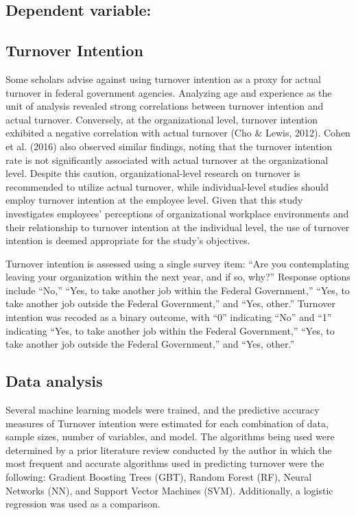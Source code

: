 \documentclass[
  man]{apa7}
\begin{document}
\hypertarget{dependent-variable}{%
\subsection{Dependent variable:}\label{dependent-variable}}

\hypertarget{turnover-intention}{%
\subsection{Turnover Intention}\label{turnover-intention}}

Some scholars advise against using turnover intention as a proxy for actual turnover in federal government agencies.
Analyzing age and experience as the unit of analysis revealed strong correlations between turnover intention and actual turnover.
Conversely, at the organizational level, turnover intention exhibited a negative correlation with actual turnover (Cho \& Lewis, 2012).
Cohen et al. (2016) also observed similar findings, noting that the turnover intention rate is not significantly associated with actual turnover at the organizational level.
Despite this caution, organizational-level research on turnover is recommended to utilize actual turnover, while individual-level studies should employ turnover intention at the employee level.
Given that this study investigates employees' perceptions of organizational workplace environments and their relationship to turnover intention at the individual level, the use of turnover intention is deemed appropriate for the study's objectives.

Turnover intention is assessed using a single survey item: ``Are you contemplating leaving your organization within the next year, and if so, why?'' Response options include ``No,'' ``Yes, to take another job within the Federal Government,'' ``Yes, to take another job outside the Federal Government,'' and ``Yes, other.'' Turnover intention was recoded as a binary outcome, with ``0'' indicating ``No'' and ``1'' indicating ``Yes, to take another job within the Federal Government,'' ``Yes, to take another job outside the Federal Government,'' and ``Yes, other.''

\hypertarget{data-analysis}{%
\subsection{Data analysis}\label{data-analysis}}

Several machine learning models were trained, and the predictive accuracy measures of Turnover intention were estimated for each combination of data, sample sizes, number of variables, and model.
The algorithms being used were determined by a prior literature review conducted by the author in which the most frequent and accurate algorithms used in predicting turnover were the following: Gradient Boosting Trees (GBT), Random Forest (RF), Neural Networks (NN), and Support Vector Machines (SVM).
Additionally, a logistic regression was used as a comparison.
\end{document}
